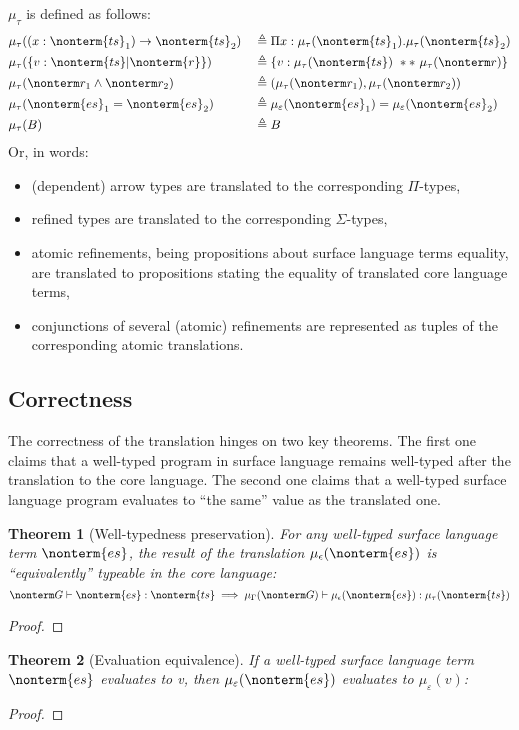 \documentclass[a4paper]{article}
\newtheorem{theorem}{Theorem}
\begin{document}
$\mu_\tau$ is defined as follows:
\begin{equation}
\begin{aligned}
  & \mu_\tau( (x : \nonterm{ts}_1) \rightarrow \nonterm{ts}_2)  && \triangleq \Pi x : \mu_\tau(\nonterm{ts}_1). \mu_\tau(\nonterm{ts}_2)        \\
  & \mu_\tau( \{ v : \nonterm{ts} | \nonterm{r} \})             && \triangleq \{ v : \mu_\tau(\nonterm{ts})\ **\ \mu_\tau(\nonterm r) \}        \\
  & \mu_\tau( \nonterm r_1 \land \nonterm r_2 )                 && \triangleq ( \mu_\tau(\nonterm r_1) , \mu_\tau(\nonterm r_2))                \\
  & \mu_\tau( \nonterm{es}_1 = \nonterm{es}_2 )                 && \triangleq \mu_\varepsilon(\nonterm{es}_1) = \mu_\varepsilon(\nonterm{es}_2) \\
  & \mu_\tau(B)                                                 && \triangleq B                                                                 \\
\end{aligned}
\end{equation}
Or, in words:
\begin{itemize}
  \item (dependent) arrow types are translated to the corresponding $\Pi$-types,
  \item refined types are translated to the corresponding $\Sigma$-types,
  \item atomic refinements, being propositions about surface language terms equality,
    are translated to propositions stating the equality of translated core language terms,
  \item conjunctions of several (atomic) refinements are represented as tuples of the corresponding atomic translations.
\end{itemize}

\subsection{Correctness}

The correctness of the translation hinges on two key theorems.
The first one claims that a well-typed program in surface language remains well-typed after the translation to the core language.
The second one claims that a well-typed surface language program evaluates to ``the same'' value as the translated one.

\begin{theorem}[Well-typedness preservation]
  For any well-typed surface language term $\nonterm{es}$,
  the result of the translation $\mu_\epsilon(\nonterm{es})$ is ``equivalently'' typeable in the core language:
  \[
    \nonterm G \vdash \nonterm{es} : \nonterm{ts} \implies \mu_\Gamma(\nonterm G) \vdash \mu_\epsilon(\nonterm{es}) : \mu_\tau(\nonterm{ts})
  \]
\end{theorem}
\begin{proof}
\end{proof}

\begin{theorem}[Evaluation equivalence]
  If a well-typed surface language term $\nonterm{es}$ evaluates to v, then $\mu_\varepsilon(\nonterm{es})$ evaluates to $\mu_\varepsilon(v)$:
\end{theorem}
\begin{proof}
\end{proof}
\end{document}
